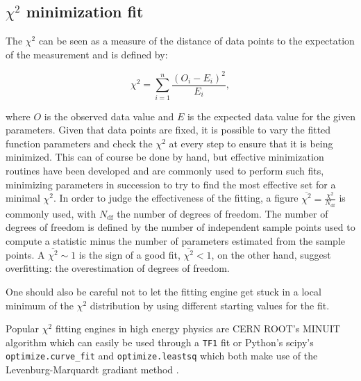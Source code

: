 \subsection{$\chi^2$ minimization fit}

The $\chi^2$ can be seen as a measure of the distance of data points to the expectation of the measurement and is defined by:

\begin{equation}
\chi^2=\sum_{i=1}^{n}\frac{(O_i-E_i)^2}{E_i},
\end{equation}

where $O$ is the observed data value and $E$ is the expected data value for the given parameters. Given that data points are fixed, it is possible to vary the fitted function parameters and check the $\chi^2$ at every step to ensure that it is being minimized. This can of course be done by hand, but effective minimization routines have been developed and are commonly used to perform such fits, minimizing parameters in succession to try to find the most effective set for a minimal $\chi^2$. In order to judge the effectiveness of the fitting, a figure $\overline{\chi^2}=\frac{\chi^2}{N_{\text{df}}}$ is commonly used, with $N_{\text{df}}$ the number of degrees of freedom. The number of degrees of freedom is defined by the number of independent sample points used to compute a statistic minus the number of parameters estimated from the sample points. A $\overline{\chi^2}\sim 1$ is the sign of a good fit, $\overline{\chi^2} < 1$, on the other hand, suggest overfitting: the overestimation of degrees of freedom.


One should also be careful not to let the fitting engine get stuck in a local minimum of the $\chi^2$ distribution by using different starting values for the fit.

Popular $\chi^2$ fitting engines in high energy physics are CERN ROOT's MINUIT algorithm \cite{MINUIT} which can easily be used through a \texttt{TF1} fit or Python's scipy's \texttt{optimize.curve\_fit} and \texttt{optimize.leastsq} which both make use of the Levenburg-Marquardt gradiant method \cite{article}.


